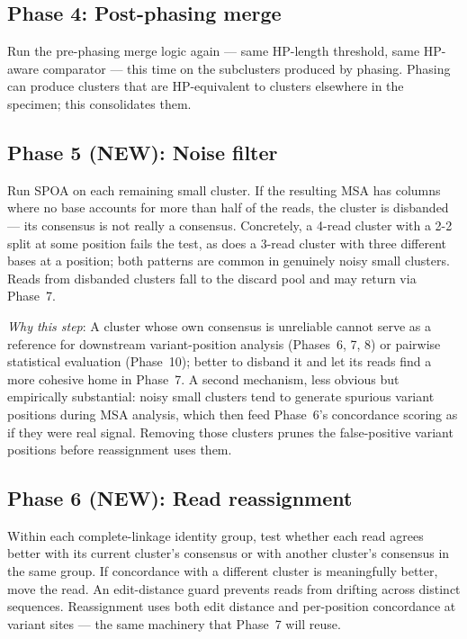\documentclass[11pt]{article}
\begin{document}
\subsection*{Phase 4: Post-phasing merge}

Run the pre-phasing merge logic again --- same HP-length threshold, same
HP-aware comparator --- this time on the subclusters produced by phasing.
Phasing can produce clusters that are HP-equivalent to clusters elsewhere
in the specimen; this consolidates them.

\subsection*{Phase 5 (NEW): Noise filter}

Run SPOA on each remaining small cluster. If the resulting MSA has columns
where no base accounts for more than half of the reads, the cluster is
disbanded --- its consensus is not really a consensus. Concretely, a 4-read
cluster with a 2-2 split at some position fails the test, as does a 3-read
cluster with three different bases at a position; both patterns are common
in genuinely noisy small clusters. Reads from disbanded clusters fall to the
discard pool and may return via Phase~7.

\emph{Why this step}: A cluster whose own consensus is unreliable cannot serve
as a reference for downstream variant-position analysis (Phases~6, 7, 8) or
pairwise statistical evaluation (Phase~10); better to disband it and let its
reads find a more cohesive home in Phase~7. A second mechanism, less
obvious but empirically substantial: noisy small clusters tend to generate
spurious variant positions during MSA analysis, which then feed Phase~6's
concordance scoring as if they were real signal. Removing those clusters
prunes the false-positive variant positions before reassignment uses them.

\subsection*{Phase 6 (NEW): Read reassignment}

Within each complete-linkage identity group, test whether each read agrees
better with its current cluster's consensus or with another cluster's
consensus in the same group. If concordance with a different cluster is
meaningfully better, move the read. An edit-distance guard prevents reads
from drifting across distinct sequences. Reassignment uses both edit distance
and per-position concordance at variant sites --- the same machinery that
Phase~7 will reuse.
\end{document}
